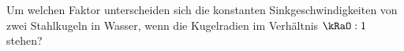 Um welchen Faktor unterscheiden sich die konstanten Sinkgeschwindigkeiten von zwei Stahlkugeln in Wasser, wenn die Kugelradien im Verhältnis $\kRaO : 1$ stehen?
